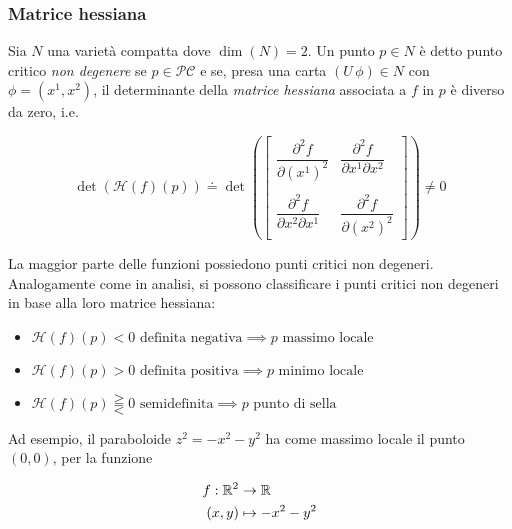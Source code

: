 \subsubsection{Matrice hessiana}

Sia $ N $ una varietà compatta dove $ \dim(N)=2 $. Un punto $ p \in N $  è detto punto critico \textit{non degenere} se $ p \in \mathcal{PC} $ e se, presa una carta $ (U\,\phi) \in N $ con $ \phi = (x^{1},x^{2}) $, il determinante della \textit{matrice hessiana} associata a $ f $ in $ p $ è diverso da zero, i.e.

\begin{equation}
	\det(\mathcal{H}(f)(p)) \doteq \det (\begin{bmatrix} \dfrac{\partial^{2} f}{\partial (x^{1})^{2}} & \dfrac{\partial^{2} f}{\partial x^{1} \partial x^{2}} \\\\ \dfrac{\partial^{2} f}{\partial x^{2} \partial x^{1}} & \dfrac{\partial^{2} f}{\partial (x^{2})^{2}} \end{bmatrix}) \neq 0
\end{equation}

La maggior parte delle funzioni possiedono punti critici non degeneri.\\
Analogamente come in analisi, si possono classificare i punti critici non degeneri in base alla loro matrice hessiana:

\begin{itemize}
	\item $ \mathcal{H}(f)(p) < 0 \text{ definita negativa} \implies p \text{ massimo locale} $
	
	\item $ \mathcal{H}(f)(p) > 0 \text{ definita positiva} \implies p \text{ minimo locale} $
	
	\item $ \mathcal{H}(f)(p) \gtreqqless 0 \text{ semidefinita} \implies p \text{ punto di sella} $
\end{itemize}

Ad esempio, il paraboloide $ z^{2} = - x^{2} - y^{2} $ ha come massimo locale il punto $ (0,0) $, per la funzione

\begin{align}
	\begin{split}
		f : \mathbb{R}^{2} &\to \mathbb{R}\\
		(x,y) &\mapsto - x^{2} - y^{2}
	\end{split}
\end{align}

